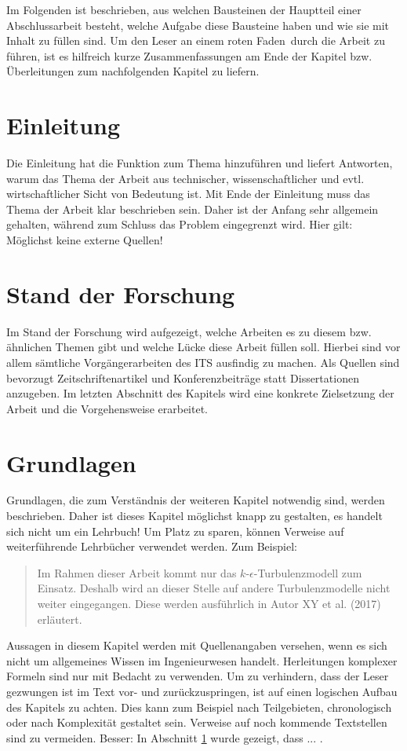Im Folgenden ist beschrieben, aus welchen Bausteinen der Hauptteil einer Abschlussarbeit besteht, welche Aufgabe diese Bausteine haben und wie sie mit Inhalt zu füllen sind. Um den Leser an einem \glqq roten Faden\grqq~durch die Arbeit zu führen, ist es hilfreich kurze Zusammenfassungen am Ende der Kapitel bzw. Überleitungen zum nachfolgenden Kapitel zu liefern.

\section{Einleitung}
\label{SECTION:Einleitung}

Die Einleitung hat die Funktion zum Thema hinzuführen und liefert Antworten, warum das Thema der Arbeit aus technischer, wissenschaftlicher und evtl. wirtschaftlicher Sicht von Bedeutung ist. Mit Ende der Einleitung muss das Thema der Arbeit klar beschrieben sein. Daher ist der Anfang sehr allgemein gehalten, während zum Schluss das Problem eingegrenzt wird. Hier gilt: Möglichst keine externe Quellen!

\section{Stand der Forschung}

Im Stand der Forschung wird aufgezeigt, welche Arbeiten es zu diesem bzw. ähnlichen Themen gibt und welche Lücke diese Arbeit füllen soll. Hierbei sind vor allem sämtliche Vorgängerarbeiten des ITS ausfindig zu machen. Als Quellen sind bevorzugt Zeitschriftenartikel und Konferenzbeiträge statt Dissertationen anzugeben. Im letzten Abschnitt des Kapitels wird eine konkrete Zielsetzung der Arbeit und die Vorgehensweise erarbeitet.


\section{Grundlagen}

Grundlagen, die zum Verständnis der weiteren Kapitel notwendig sind, werden beschrieben. Daher ist dieses Kapitel möglichst knapp zu gestalten, es handelt sich nicht um ein Lehrbuch! Um Platz zu sparen, können Verweise auf weiterführende Lehrbücher verwendet werden. Zum Beispiel: 
\begin{quote}
	\glqq Im Rahmen dieser Arbeit kommt nur das $k\text{-}\epsilon$-Turbulenzmodell zum Einsatz. Deshalb wird an dieser Stelle auf andere Turbulenzmodelle nicht weiter eingegangen. Diese werden ausführlich in Autor XY et al. (2017) erläutert.\grqq
\end{quote}
Aussagen in diesem Kapitel werden mit Quellenangaben versehen, wenn es sich nicht um allgemeines Wissen im Ingenieurwesen handelt. Herleitungen komplexer Formeln sind nur mit Bedacht zu verwenden. Um zu verhindern, dass der Leser gezwungen ist im Text vor- und zurückzuspringen, ist auf einen logischen Aufbau des Kapitels zu achten. Dies kann zum Beispiel nach Teilgebieten, chronologisch oder nach Komplexität gestaltet sein. Verweise auf noch kommende Textstellen sind zu vermeiden. Besser: \glqq In Abschnitt \ref{SECTION:Einleitung} wurde gezeigt, dass ... \grqq.


